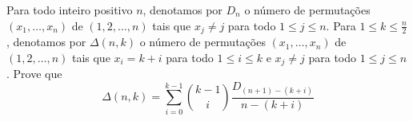 Para todo inteiro positivo \(n\), denotamos por \(D_n\) o número de permutações \((x_1, \dots, x_n)\) de \((1,2,\dots, n)\) tais que \(x_j\neq j\) para todo \(1\le j\le n\). Para \(1\le k\le \frac{n}{2}\), denotamos por \(\Delta (n,k)\) o número de permutações \((x_1,\dots, x_n)\) de \((1,2,\dots, n)\) tais que \(x_i=k+i\) para todo \(1\le i\le k\) e \(x_j\neq j\) para todo \(1\le j\le n\). Prove que
\[\Delta (n,k)=\sum_{i=0}^{k-1} \binom{k-1}{i} \frac{D_{(n+1)-(k+i)}}{n-(k+i)}\]
